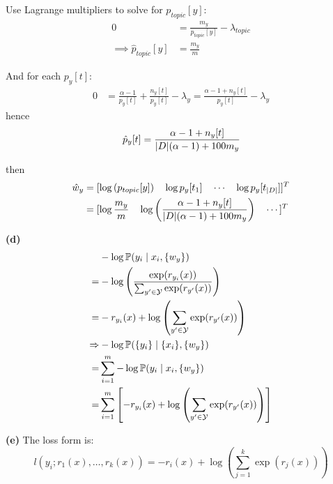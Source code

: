 \documentclass[a4paper, 11pt]{article}
\begin{document}
\begin{problem}
    Use Lagrange multipliers to solve for $p_{topic}[y]$:
    \begin{align*}
        0 &= \frac{m_{y}}{p_{topic}[y]} - \lambda_{topic} \\
        \implies \hat{p}_{topic}[y] &= \frac{m_y}{m}
    \end{align*}

    And for each $p_{y}[t]$:
    \begin{align*}
        0 &= \frac{\alpha - 1}{p_{y}[t]} + \frac{n_{y}[t]}{p_{y}[t]} - \lambda_y = \frac{\alpha - 1 + n_{y}[t]}{p_y[t]} - \lambda_y
    \end{align*}
    hence \begin{equation*}
    \hat{p}_y[t] = \frac{\alpha - 1 + n_y[t]}{\lvert D\rvert(\alpha - 1) + 100m_y}
    \end{equation*}

    then \begin{align*}
    \hat{w}_y &= [\log \left(p_{topic}[y] \right) \quad \log p_y[t_1] \quad \cdots \quad \log p_y[t_{\lvert D\rvert}]]^T  \\
    &= [\log \frac{m_y}{m} \quad \log \left(\frac{\alpha - 1 + n_y[t]}{\lvert D\rvert(\alpha - 1) + 100m_y}\right) \quad \cdots]^T
    \end{align*}

    \textbf{(d)} \begin{align*}
        &- \log \mathbb{P}(y_i \mid x_i, \{w_y\})\\
         = &- \log \left(\frac{\exp (r_{y_i}(x))}{\sum_{y' \in \mathcal{Y}} \exp(r_{y'}(x))}\right) \\
        = & - r_{y_i}(x) + \log\left(\sum_{y' \in \mathcal{Y}} \exp(r_{y'}(x))\right) \\
        \Rightarrow &-\log \mathbb{P}(\{y_i\} \mid \{x_i\}, \{w_y\}) \\
        = & \sum_{i=1}^{m} -\log \mathbb{P}(y_i \mid x_i, \{w_y\}) \\
        = & \sum_{i=1}^{m} \left[- r_{y_i}(x) + \log\left(\sum_{y' \in \mathcal{Y}} \exp(r_{y'}(x))\right)\right]
    \end{align*}

    \textbf{(e)} The loss form is:
    \begin{equation*}
    l(y_i; r_1(x), \ldots, r_k(x)) = -r_{i}(x) + \log \left(\sum_{j=1}^{k} \exp(r_j(x))\right)  
    \end{equation*}
\end{problem}
\end{document}
